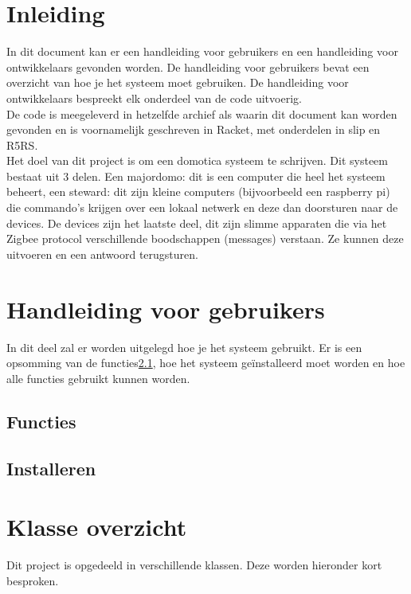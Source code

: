 \documentclass{article}
\begin{document}
\section{Inleiding}\label{inleiding}
In dit document kan er een handleiding voor gebruikers en een handleiding voor ontwikkelaars gevonden worden. De handleiding voor gebruikers bevat een overzicht van hoe je het systeem moet gebruiken. De handleiding voor ontwikkelaars bespreekt elk onderdeel van de code uitvoerig.\\
De code is meegeleverd in hetzelfde archief als waarin dit document kan worden gevonden en is voornamelijk geschreven in Racket, met onderdelen in slip en R5RS.\\
Het doel van dit project is om een domotica systeem te schrijven. Dit systeem bestaat uit 3 delen. Een majordomo: dit is een computer die heel het systeem beheert, een steward: dit zijn kleine computers (bijvoorbeeld een raspberry pi) die commando's krijgen over een lokaal netwerk en deze dan doorsturen naar de devices. De devices zijn het laatste deel, dit zijn slimme apparaten die via het Zigbee protocol verschillende boodschappen (messages) verstaan. Ze kunnen deze uitvoeren en een antwoord terugsturen.\\

\section{Handleiding voor gebruikers}
\label{sec:users}
In dit deel zal er worden uitgelegd hoe je het systeem gebruikt. Er is een opsomming van de functies\ref{sub:features}, hoe het systeem ge\"{i}nstalleerd moet worden en hoe alle functies gebruikt kunnen worden.

\subsection{Functies}
\label{sub:features}


\subsection{Installeren}
\label{sub:install}



\section{Klasse overzicht}
\label{sec:klasoverzicht}
Dit project is opgedeeld in verschillende klassen. Deze worden hieronder kort besproken.\\
\end{document}
